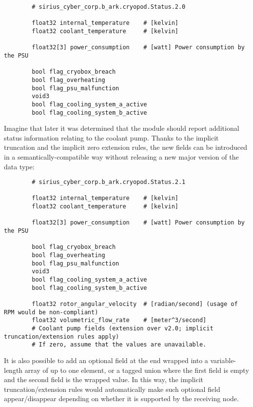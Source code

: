 \begin{remark}[breakable]
    \begin{verbatim}
        # sirius_cyber_corp.b_ark.cryopod.Status.2.0

        float32 internal_temperature    # [kelvin]
        float32 coolant_temperature     # [kelvin]

        float32[3] power_consumption    # [watt] Power consumption by the PSU

        bool flag_cryobox_breach
        bool flag_overheating
        bool flag_psu_malfunction
        void3
        bool flag_cooling_system_a_active
        bool flag_cooling_system_b_active
    \end{verbatim}

    Imagine that later it was determined that the module should report additional status information
    relating to the coolant pump.
    Thanks to the implicit truncation and the implicit zero extension rules,
    the new fields can be introduced in a semantically-compatible way without releasing
    a new major version of the data type:

    \begin{verbatim}
        # sirius_cyber_corp.b_ark.cryopod.Status.2.1

        float32 internal_temperature    # [kelvin]
        float32 coolant_temperature     # [kelvin]

        float32[3] power_consumption    # [watt] Power consumption by the PSU

        bool flag_cryobox_breach
        bool flag_overheating
        bool flag_psu_malfunction
        void3
        bool flag_cooling_system_a_active
        bool flag_cooling_system_b_active

        float32 rotor_angular_velocity  # [radian/second] (usage of RPM would be non-compliant)
        float32 volumetric_flow_rate    # [meter^3/second]
        # Coolant pump fields (extension over v2.0; implicit truncation/extension rules apply)
        # If zero, assume that the values are unavailable.
    \end{verbatim}

    It is also possible to add an optional field at the end wrapped into a variable-length
    array of up to one element, or a tagged union where the first field is empty
    and the second field is the wrapped value.
    In this way, the implicit truncation/extension rules would automatically make such optional field
    appear/disappear depending on whether it is supported by the receiving node.


\end{remark}
